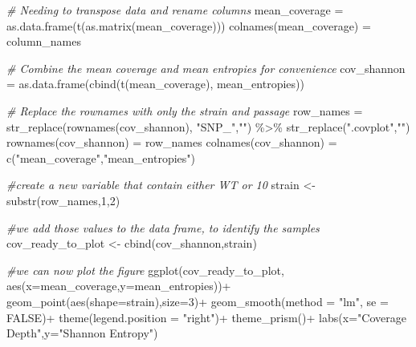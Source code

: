 \documentclass[
]{article}
\newenvironment{Shaded}{\begin{snugshade}}{\end{snugshade}}
\newcommand{\AttributeTok}[1]{\textcolor[rgb]{0.77,0.63,0.00}{#1}}
\newcommand{\CommentTok}[1]{\textcolor[rgb]{0.56,0.35,0.01}{\textit{#1}}}
\newcommand{\ConstantTok}[1]{\textcolor[rgb]{0.00,0.00,0.00}{#1}}
\newcommand{\DecValTok}[1]{\textcolor[rgb]{0.00,0.00,0.81}{#1}}
\newcommand{\FunctionTok}[1]{\textcolor[rgb]{0.00,0.00,0.00}{#1}}
\newcommand{\NormalTok}[1]{#1}
\newcommand{\OtherTok}[1]{\textcolor[rgb]{0.56,0.35,0.01}{#1}}
\newcommand{\SpecialCharTok}[1]{\textcolor[rgb]{0.00,0.00,0.00}{#1}}
\newcommand{\StringTok}[1]{\textcolor[rgb]{0.31,0.60,0.02}{#1}}
\begin{document}
\begin{Shaded}
\begin{Highlighting}[]
\CommentTok{\# Needing to transpose data and rename columns}
\NormalTok{mean\_coverage }\OtherTok{=} \FunctionTok{as.data.frame}\NormalTok{(}\FunctionTok{t}\NormalTok{(}\FunctionTok{as.matrix}\NormalTok{(mean\_coverage)))}
\FunctionTok{colnames}\NormalTok{(mean\_coverage) }\OtherTok{=}\NormalTok{ column\_names}

\CommentTok{\# Combine the mean coverage and mean entropies for convenience}
\NormalTok{cov\_shannon }\OtherTok{=} \FunctionTok{as.data.frame}\NormalTok{(}\FunctionTok{cbind}\NormalTok{(}\FunctionTok{t}\NormalTok{(mean\_coverage), mean\_entropies))}

\CommentTok{\# Replace the rownames with only the strain and passage}
\NormalTok{row\_names }\OtherTok{=} \FunctionTok{str\_replace}\NormalTok{(}\FunctionTok{rownames}\NormalTok{(cov\_shannon), }\StringTok{"SNP\_"}\NormalTok{,}\StringTok{""}\NormalTok{) }\SpecialCharTok{\%\textgreater{}\%} \FunctionTok{str\_replace}\NormalTok{(}\StringTok{".covplot"}\NormalTok{,}\StringTok{""}\NormalTok{)}
\FunctionTok{rownames}\NormalTok{(cov\_shannon) }\OtherTok{=}\NormalTok{ row\_names}
\FunctionTok{colnames}\NormalTok{(cov\_shannon) }\OtherTok{=} \FunctionTok{c}\NormalTok{(}\StringTok{"mean\_coverage"}\NormalTok{,}\StringTok{"mean\_entropies"}\NormalTok{)  }
\end{Highlighting}
\end{Shaded}

\begin{Shaded}
\begin{Highlighting}[]
\CommentTok{\#create a new variable that contain either WT or 10}
\NormalTok{strain }\OtherTok{\textless{}{-}}\FunctionTok{substr}\NormalTok{(row\_names,}\DecValTok{1}\NormalTok{,}\DecValTok{2}\NormalTok{)}

\CommentTok{\#we add those values to the data frame, to identify the samples}
\NormalTok{cov\_ready\_to\_plot }\OtherTok{\textless{}{-}} \FunctionTok{cbind}\NormalTok{(cov\_shannon,strain)}

\CommentTok{\#we can now plot the figure}
\FunctionTok{ggplot}\NormalTok{(cov\_ready\_to\_plot, }\FunctionTok{aes}\NormalTok{(}\AttributeTok{x=}\NormalTok{mean\_coverage,}\AttributeTok{y=}\NormalTok{mean\_entropies))}\SpecialCharTok{+}
  \FunctionTok{geom\_point}\NormalTok{(}\FunctionTok{aes}\NormalTok{(}\AttributeTok{shape=}\NormalTok{strain),}\AttributeTok{size=}\DecValTok{3}\NormalTok{)}\SpecialCharTok{+}
  \FunctionTok{geom\_smooth}\NormalTok{(}\AttributeTok{method =} \StringTok{"lm"}\NormalTok{, }\AttributeTok{se =} \ConstantTok{FALSE}\NormalTok{)}\SpecialCharTok{+}
  \FunctionTok{theme}\NormalTok{(}\AttributeTok{legend.position =} \StringTok{"right"}\NormalTok{)}\SpecialCharTok{+}
  \FunctionTok{theme\_prism}\NormalTok{()}\SpecialCharTok{+}
  \FunctionTok{labs}\NormalTok{(}\AttributeTok{x=}\StringTok{"Coverage Depth"}\NormalTok{,}\AttributeTok{y=}\StringTok{"Shannon Entropy"}\NormalTok{)}
\end{Highlighting}
\end{Shaded}
\end{document}
